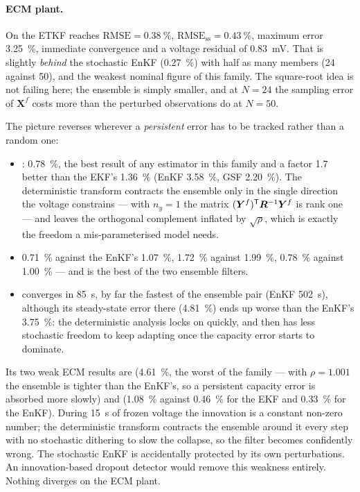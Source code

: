 \paragraph{ECM plant.}  On  the ETKF reaches $\mathrm{RMSE} = \SI{0.38}{\percent}$,
$\mathrm{RMSE}_{\mathrm{ss}} = \SI{0.43}{\percent}$, maximum error \SI{3.25}{\percent}, immediate
convergence and a voltage residual of \SI{0.83}{\milli\volt}.  That is slightly \emph{behind} the
stochastic EnKF (\SI{0.27}{\percent}) with half as many members (24 against 50), and the weakest
nominal figure of this family.  The square-root idea is not failing here; the ensemble is simply
smaller, and at $N = 24$ the sampling error of $\bm{X}^f$ costs more than the perturbed
observations do at $N = 50$.

The picture reverses wherever a \emph{persistent} error has to be tracked rather than a random one:
\begin{itemize}[leftmargin=2em]
  \item {}: \SI{0.78}{\percent}, the best result of any estimator in this family
        and a factor \num{1.7} better than the EKF's \SI{1.36}{\percent} (EnKF \SI{3.58}{\percent},
        GSF \SI{2.20}{\percent}).  The deterministic transform contracts the ensemble only in the
        single direction the voltage constrains --- with $n_y = 1$ the matrix $(\bm{Y}^f)^{\mathsf{T}}\bm{R}^{-1}\bm{Y}^f$
        is rank one --- and leaves the orthogonal complement inflated by $\sqrt\rho$, which is
        exactly the freedom a mis-parameterised model needs.
  \item {} \SI{0.71}{\percent} against the EnKF's \SI{1.07}{\percent}, 
        \SI{1.72}{\percent} against \SI{1.99}{\percent},  \SI{0.78}{\percent} against
        \SI{1.00}{\percent} --- and  is the best of the two ensemble filters.
  \item {} converges in \SI{85}{\second}, by far the fastest of the ensemble pair
        (EnKF \SI{502}{\second}), although its steady-state error there (\SI{4.81}{\percent}) ends
        up worse than the EnKF's \SI{3.75}{\percent}: the deterministic analysis locks on quickly,
        and then has less stochastic freedom to keep adapting once the capacity error starts to
        dominate.
\end{itemize}
Its two weak ECM results are  (\SI{4.61}{\percent}, the worst of the family ---
with $\rho = 1.001$ the ensemble is tighter than the EnKF's, so a persistent capacity error is
absorbed more slowly) and  (\SI{1.08}{\percent} against \SI{0.46}{\percent}
for the EKF and \SI{0.33}{\percent} for the EnKF).  During \SI{15}{\second} of frozen voltage the
innovation is a constant non-zero number; the deterministic transform contracts the ensemble around
it every step with no stochastic dithering to slow the collapse, so the filter becomes confidently
wrong.  The stochastic EnKF is accidentally protected by its own perturbations.  An innovation-based
dropout detector would remove this weakness entirely.  Nothing diverges on the ECM plant.

